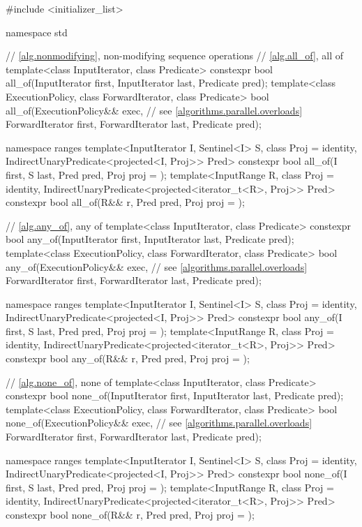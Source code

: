 \begin{codeblock}
#include <initializer_list>

namespace std {
  // \ref{alg.nonmodifying}, non-modifying sequence operations
  // \ref{alg.all_of}, all of
  template<class InputIterator, class Predicate>
    constexpr bool all_of(InputIterator first, InputIterator last, Predicate pred);
  template<class ExecutionPolicy, class ForwardIterator, class Predicate>
    bool all_of(ExecutionPolicy&& exec, // see \ref{algorithms.parallel.overloads}
                ForwardIterator first, ForwardIterator last, Predicate pred);

  namespace ranges {
    template<InputIterator I, Sentinel<I> S, class Proj = identity,
        IndirectUnaryPredicate<projected<I, Proj>> Pred>
      constexpr bool all_of(I first, S last, Pred pred, Proj proj = {});
    template<InputRange R, class Proj = identity,
        IndirectUnaryPredicate<projected<iterator_t<R>, Proj>> Pred>
      constexpr bool all_of(R&& r, Pred pred, Proj proj = {});
  }

  // \ref{alg.any_of}, any of
  template<class InputIterator, class Predicate>
    constexpr bool any_of(InputIterator first, InputIterator last, Predicate pred);
  template<class ExecutionPolicy, class ForwardIterator, class Predicate>
    bool any_of(ExecutionPolicy&& exec, // see \ref{algorithms.parallel.overloads}
                ForwardIterator first, ForwardIterator last, Predicate pred);

  namespace ranges {
    template<InputIterator I, Sentinel<I> S, class Proj = identity,
        IndirectUnaryPredicate<projected<I, Proj>> Pred>
      constexpr bool any_of(I first, S last, Pred pred, Proj proj = {});
    template<InputRange R, class Proj = identity,
        IndirectUnaryPredicate<projected<iterator_t<R>, Proj>> Pred>
      constexpr bool any_of(R&& r, Pred pred, Proj proj = {});
  }

  // \ref{alg.none_of}, none of
  template<class InputIterator, class Predicate>
    constexpr bool none_of(InputIterator first, InputIterator last, Predicate pred);
  template<class ExecutionPolicy, class ForwardIterator, class Predicate>
    bool none_of(ExecutionPolicy&& exec, // see \ref{algorithms.parallel.overloads}
                 ForwardIterator first, ForwardIterator last, Predicate pred);

  namespace ranges {
    template<InputIterator I, Sentinel<I> S, class Proj = identity,
        IndirectUnaryPredicate<projected<I, Proj>> Pred>
      constexpr bool none_of(I first, S last, Pred pred, Proj proj = {});
    template<InputRange R, class Proj = identity,
        IndirectUnaryPredicate<projected<iterator_t<R>, Proj>> Pred>
      constexpr bool none_of(R&& r, Pred pred, Proj proj = {});
  }

}
\end{codeblock}
